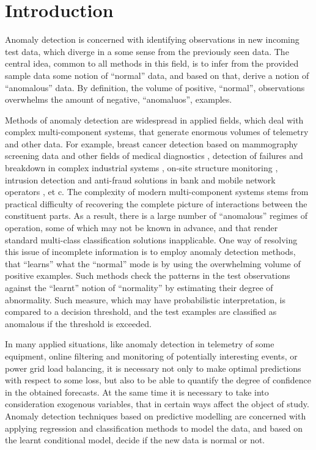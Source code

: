 \documentclass[a4paper,14pt]{extarticle}
\begin{document}
\clearpage
\begin{titlepage}
\tableofcontents
\end{titlepage}

\clearpage
{}

\section{Introduction} %
\label{sec:introduction}

Anomaly detection is concerned with identifying observations in new incoming test
data, which diverge in a some sense from the previously seen data. The central idea,
common to all methods in this field, is to infer from the provided sample data some
notion of ``normal'' data, and based on that, derive a notion of ``anomalous'' data.
By definition, the volume of positive, ``normal'', observations overwhelms the amount
of negative, ``anomaluos'', examples.

Methods of anomaly detection are widespread in applied fields, which deal with complex
multi-component systems, that generate enormous volumes of telemetry and other data.
For example, breast cancer detection based on mammography screening data \cite{tarassenko1995}
and other fields of medical diagnostics \cite{quinn2007,clifton2011}, detection of
failures and breakdown in complex industrial systems \cite{tarassenko2009}, on-site
structure monitoring \cite{surace2010}, intrusion detection and anti-fraud solutions
in bank and mobile network operators \cite{patcha2007,jyothsna2011}, et c. The complexity
of modern multi-component systems stems from practical difficulty of recovering the
complete picture of interactions between the constituent parts. As a result, there
is a large number of ``anomalous'' regimes of operation, some of which may not be
known in advance, and that render standard multi-class classification solutions inapplicable.
One way of resolving this issue of incomplete information is to employ anomaly detection
methods, that ``learns'' what the ``normal'' mode is by using the overwhelming volume
of positive examples. Such methods check the patterns in the test observations against
the ``learnt'' notion of ``normality'' by estimating their degree of abnormality.
Such measure, which may have probabilistic interpretation, is compared to a decision
threshold, and the test examples are classified as anomalous if the threshold is
exceeded.

In many applied situations, like anomaly detection in telemetry of some equipment,
online filtering and monitoring of potentially interesting events, or power grid
load balancing, it is necessary not only to make optimal predictions with respect
to some loss, but also to be able to quantify the degree of confidence in the obtained
forecasts. At the same time it is necessary to take into consideration exogenous
variables, that in certain ways affect the object of study. Anomaly detection techniques
based on predictive modelling are concerned with applying regression and classification
methods to model the data, and based on the learnt conditional model, decide if the
new data is normal or not.
\end{document}
